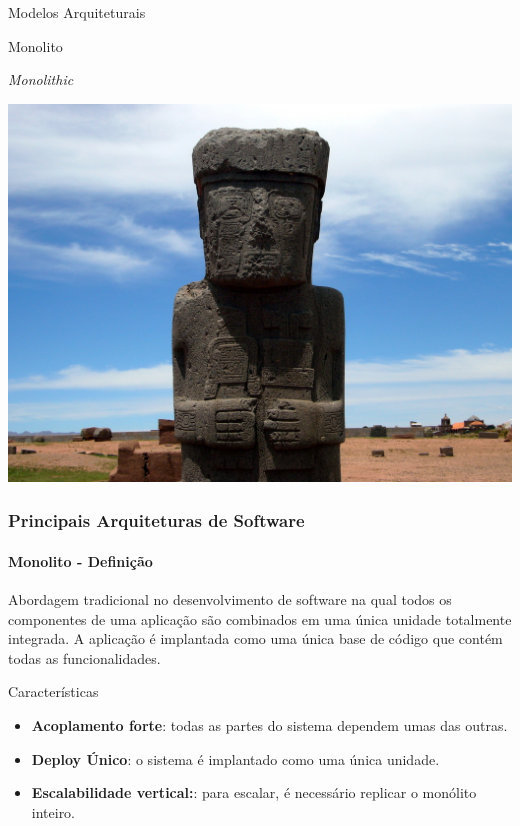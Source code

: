 \documentclass[
	10pt, %
	t, %
]{beamer}
\begin{document}
\begin{frame}
	\begin{center}
		
		\bigskip\bigskip %
		{\Large Modelos Arquiteturais}
		
		\bigskip\bigskip %
		{\Huge Monolito}
		
		\smallskip
		{\small \textit{Monolithic}}
		\smallskip

		\includegraphics[width=0.5\linewidth]{Images/monolito_estrutura.jpg}
	\end{center}

\end{frame}

\begin{frame}
	\frametitle{Principais Arquiteturas de Software}
	\framesubtitle{Monolito - Definição}
	
	Abordagem tradicional no desenvolvimento de software na qual todos os componentes de uma aplicação são combinados em uma única unidade totalmente integrada. A aplicação é implantada como uma \alert{única base de código} que contém todas as funcionalidades.

	\begin{exampleblock}{Características}
		\begin{itemize}
			\item \textbf{Acoplamento forte}: todas as partes do sistema dependem umas das outras.
			\item \textbf{Deploy Único}: o sistema é implantado como uma única unidade.
			\item \textbf{Escalabilidade vertical:}: para escalar, é necessário replicar o monólito inteiro.
		\end{itemize}
	\end{exampleblock}

\end{frame}
\end{document}
